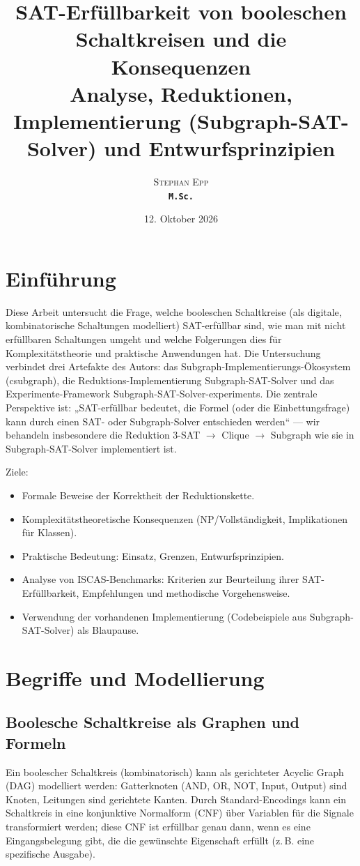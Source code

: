 \documentclass[a4paper,12pt]{article}
\title{\textbf{SAT-Erfüllbarkeit von booleschen Schaltkreisen
und die Konsequenzen}\\[0.5em]
\large Analyse, Reduktionen, Implementierung (Subgraph-SAT-Solver) und Entwurfsprinzipien}
\author{\textsc{Stephan Epp}\\ {\small \texttt{\textbf{M.Sc.}}}}
\date{12. Oktober 2026}
\theoremstyle{definition}
\begin{document}
\maketitle
\tableofcontents
\newpage

\section{Einführung}
\label{ch:intro}

Diese Arbeit untersucht die Frage, welche booleschen Schaltkreise (als digitale, kombinatorische Schaltungen modelliert) SAT-erfüllbar sind, wie man mit nicht erfüllbaren Schaltungen umgeht und welche Folgerungen dies für Komplexitätstheorie und praktische Anwendungen hat. Die Untersuchung verbindet drei Artefakte des Autors: das Subgraph-Implementierungs-Ökosystem (csubgraph), die Reduktions-Implementierung Subgraph-SAT-Solver und das Experimente-Framework Subgraph-SAT-Solver-experiments. Die zentrale Perspektive ist: „SAT-erfüllbar bedeutet, die Formel (oder die Einbettungsfrage) kann durch einen SAT- oder Subgraph-Solver entschieden werden“ — wir behandeln insbesondere die Reduktion 3-SAT $\to$ Clique $\to$ Subgraph wie sie in Subgraph-SAT-Solver implementiert ist.

Ziele:
\begin{itemize}
  \item Formale Beweise der Korrektheit der Reduktionskette.
  \item Komplexitätstheoretische Konsequenzen (NP/Vollständigkeit, Implikationen für Klassen).
  \item Praktische Bedeutung: Einsatz, Grenzen, Entwurfsprinzipien.
  \item Analyse von ISCAS-Benchmarks: Kriterien zur Beurteilung ihrer SAT-Erfüllbarkeit, Empfehlungen und methodische Vorgehensweise.
  \item Verwendung der vorhandenen Implementierung (Codebeispiele aus Subgraph-SAT-Solver) als Blaupause.
\end{itemize}

\section{Begriffe und Modellierung}
\label{ch:foundations}

\subsection{Boolesche Schaltkreise als Graphen und Formeln}
Ein boolescher Schaltkreis (kombinatorisch) kann als gerichteter Acyclic Graph (DAG) modelliert werden: Gatterknoten (AND, OR, NOT, Input, Output) sind Knoten, Leitungen sind gerichtete Kanten. Durch Standard-Encodings kann ein Schaltkreis in eine konjunktive Normalform (CNF) über Variablen für die Signale transformiert werden; diese CNF ist erfüllbar genau dann, wenn es eine Eingangsbelegung gibt, die die gewünschte Eigenschaft erfüllt (z.\,B. eine spezifische Ausgabe).
\end{document}
